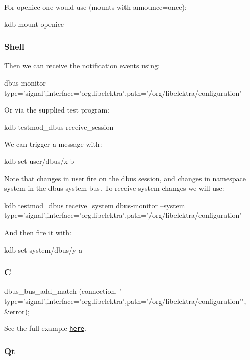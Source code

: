 For openicc one would use (mounts with announce=once)\+: \begin{DoxyVerb}kdb mount-openicc
\end{DoxyVerb}


\subsubsection*{Shell}

Then we can receive the notification events using\+: \begin{DoxyVerb}dbus-monitor type='signal',interface='org.libelektra',path='/org/libelektra/configuration'
\end{DoxyVerb}


Or via the supplied test program\+: \begin{DoxyVerb}kdb testmod_dbus receive_session
\end{DoxyVerb}


We can trigger a message with\+: \begin{DoxyVerb}kdb set user/dbus/x b
\end{DoxyVerb}


Note that changes in {\ttfamily user} fire on the dbus {\ttfamily session}, and changes in namespace {\ttfamily system} in the dbus {\ttfamily system} bus. To receive {\ttfamily system} changes we will use\+: \begin{DoxyVerb}kdb testmod_dbus receive_system
dbus-monitor --system type='signal',interface='org.libelektra',path='/org/libelektra/configuration'
\end{DoxyVerb}


And then fire it with\+: \begin{DoxyVerb}kdb set system/dbus/y a
\end{DoxyVerb}


\subsubsection*{C}


\begin{DoxyCode}
dbus\_bus\_add\_match (connection, \textcolor{stringliteral}{"
      type='signal',interface='org.libelektra',path='/org/libelektra/configuration'"}, &error);
\end{DoxyCode}


See the full example \href{/home/markus/Projekte/Elektra/current/src/plugins/dbus/receivemessage.c}{\tt here}.

\subsubsection*{Qt}

